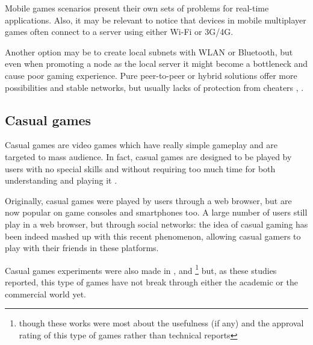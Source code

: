 Mobile games scenarios present their own sets of problems for real-time
applications. Also, it may be relevant to notice that devices in mobile
multiplayer games often connect to a server using either Wi-Fi or 3G/4G.

Another option may be to create local subnets with WLAN or Bluetooth, but
even when promoting a node as the local server it might become a
bottleneck and cause poor gaming experience.
Pure peer-to-peer or hybrid solutions offer more possibilities and
stable networks, but usually lacks of protection from cheaters
\cite{bib:can-mobile-gaming-be-improved}, \cite{bib:study-mobile-phone-sector}.

\subsection{Casual games}
Casual games are video games which have really simple gameplay and are
targeted to mass audience. In fact, casual games are designed to be played
by users with no special skills and without requiring too much time for both
understanding and playing it \cite{bib:mob-health-casual}.

Originally, casual games were played by users through a web browser, but are
now popular on game consoles and smartphones too. A large number of users still
play in a web browser, but through social networks: the idea of casual gaming
has been indeed mashed up with this recent phenomenon, allowing casual gamers to
play with their friends in these platforms.

Casual games experiments were also made in \cite{bib:ppav-casual},
\cite{bib:li-k-social-casual} and \cite{bib:mob-health-casual}\footnote{though
these works were most about the usefulness (if any) and the approval rating of
this type of games rather than technical reports} but, as these studies
reported, this type of games have not break through either the academic or the
commercial world yet.

